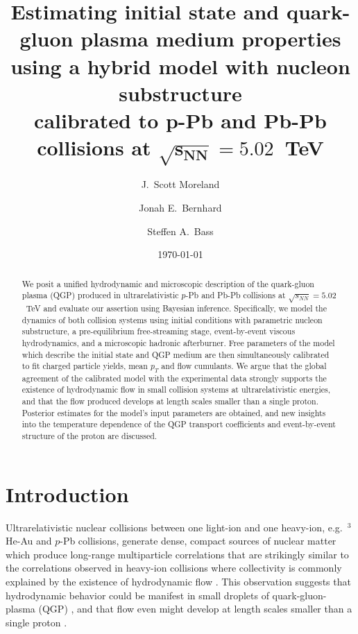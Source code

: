 \documentclass[aps,prc,reprint,amsmath,nofootinbib]{revtex4-1}
\newcommand{\sqrts}{\sqrt{s_{NN}}}
\begin{document}
\title{
  Estimating initial state and quark-gluon plasma medium properties \\
  using a hybrid model with nucleon substructure \\
  calibrated to p-Pb and Pb-Pb collisions at \texorpdfstring{$\mathbf{\sqrts=5.02}$}{}~TeV
}

\author{J.\ Scott Moreland}
\author{Jonah E.\ Bernhard}
\author{Steffen A.\ Bass}


\date{\today}

\begin{abstract}
We posit a unified hydrodynamic and microscopic description of the quark-gluon plasma (QGP) produced in ultrarelativistic $p$-Pb and Pb-Pb collisions at $\sqrts=5.02$~TeV and evaluate our assertion using Bayesian inference. Specifically, we model the dynamics of both collision systems using initial conditions with parametric nucleon substructure, a pre-equilibrium free-streaming stage, event-by-event viscous hydrodynamics, and a microscopic hadronic afterburner.
Free parameters of the model which describe the initial state and QGP medium are then simultaneously calibrated to fit charged particle yields, mean $p_T$ and flow cumulants.
We argue that the global agreement of the calibrated model with the experimental data strongly supports the existence of hydrodynamic flow in small collision systems at ultrarelativistic energies, and that the flow produced develops at length scales smaller than a single proton.
Posterior estimates for the model's input parameters are obtained, and new insights into the temperature dependence of the QGP transport coefficients and event-by-event structure of the proton are discussed.
\end{abstract}

\maketitle


\section{Introduction}

Ultrarelativistic nuclear collisions between one light-ion and one heavy-ion, e.g.\ $^3$He-Au and $p$-Pb collisions, generate dense, compact sources of nuclear matter which produce long-range multiparticle correlations that are strikingly similar to the correlations observed in heavy-ion collisions where collectivity is commonly explained by the existence of hydrodynamic flow \cite{CMS:2012qk, Abelev:2012ola, Aad:2012gla, Adare:2015ctn}.
This observation suggests that hydrodynamic behavior could be manifest in small droplets of quark-gluon-plasma (QGP) \cite{Bozek:2011if, Bozek:2013uha}, and that flow even might develop at length scales smaller than a single proton \cite{Schenke:2014zha}.
\end{document}
